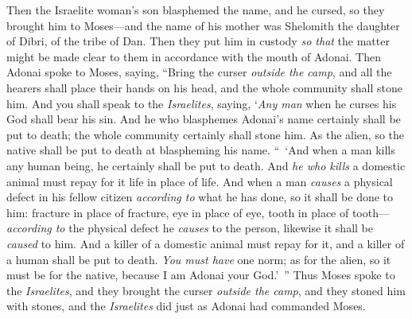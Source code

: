 \begin{biblechapter}
\verse Then the Israelite woman’s son blasphemed the name, and he cursed, so they brought him to Moses—and the name of his mother was Shelomith the daughter of Dibri, of the tribe of Dan.
\verse Then they put him in custody \textit{so that} the matter might be made clear to them in accordance with the mouth of Adonai.
\verse Then Adonai spoke to Moses, saying,
\verse “Bring the curser \textit{outside the camp}, and all the hearers shall place their hands on his head, and the whole community shall stone him.
\verse And you shall speak to the \textit{Israelites}, saying, ‘\textit{Any man} when he curses his God shall bear his sin.
\verse And he who blasphemes Adonai’s name certainly shall be put to death; the whole community certainly shall stone him. As the alien, so the native shall be put to death at blaspheming his name.
\verse “ ‘And when a man kills any human being, he certainly shall be put to death.
\verse And \textit{he who kills} a domestic animal must repay for it life in place of life.
\verse And when a man \textit{causes} a physical defect in his fellow citizen \textit{according to} what he has done, so it shall be done to him:
\verse fracture in place of fracture, eye in place of eye, tooth in place of tooth—\textit{according to} the physical defect he \textit{causes} to the person, likewise it shall be \textit{caused} to him.
\verse And a killer of a domestic animal must repay for it, and a killer of a human shall be put to death.
\verse \textit{You must have} one norm; as for the alien, so it must be for the native, because I am Adonai your God.’ ”
\verse Thus Moses spoke to the \textit{Israelites}, and they brought the curser \textit{outside the camp}, and they stoned him with stones, and the \textit{Israelites} did just as Adonai had commanded Moses.
\end{biblechapter}

